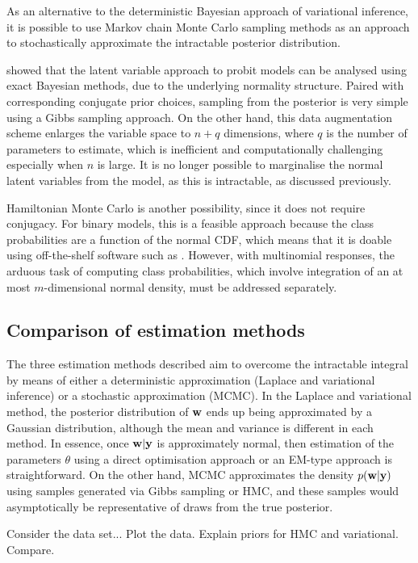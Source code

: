 As an alternative to the deterministic Bayesian approach of variational inference, it is possible to use Markov chain Monte Carlo sampling methods as an approach to stochastically approximate the intractable posterior distribution.

\citet{albert1993bayesian} showed that the latent variable approach to probit models can be analysed using exact Bayesian methods, due to the underlying normality structure.
Paired with corresponding conjugate prior choices, sampling from the posterior is very simple using a Gibbs sampling approach.
On the other hand, this data augmentation scheme enlarges the variable space to $n+q$ dimensions, where $q$ is the number of parameters to estimate, which is inefficient and computationally challenging especially when $n$ is large.
It is no longer possible to marginalise the normal latent variables from the model, as this is intractable, as discussed previously.

Hamiltonian Monte Carlo is another possibility, since it does not require conjugacy.
For binary models, this is a feasible approach because the class probabilities are a function of the normal CDF, which means that it is doable using off-the-shelf software such as .
However, with multinomial responses, the arduous task of computing class probabilities, which involve integration of an at most $m$-dimensional normal density, must be addressed separately.


\subsection{Comparison of estimation methods}


The three estimation methods described aim to overcome the intractable integral by means of either a deterministic approximation (Laplace and variational inference) or a stochastic approximation (MCMC).
In the Laplace and variational method, the posterior distribution of ${\mathbf w}$ ends up being approximated by a Gaussian distribution, although the mean and variance is different in each method.
In essence, once ${\mathbf w}|{\mathbf y}$ is approximately normal, then estimation of the parameters $\theta$ using a direct optimisation approach or an EM-type approach is straightforward.
On the other hand, MCMC approximates the density $p({\mathbf w}|{\mathbf y})$ using samples generated via Gibbs sampling or HMC, and these samples would asymptotically be representative of draws from the true posterior.

Consider the data set...
Plot the data. Explain priors for HMC and variational. Compare.



